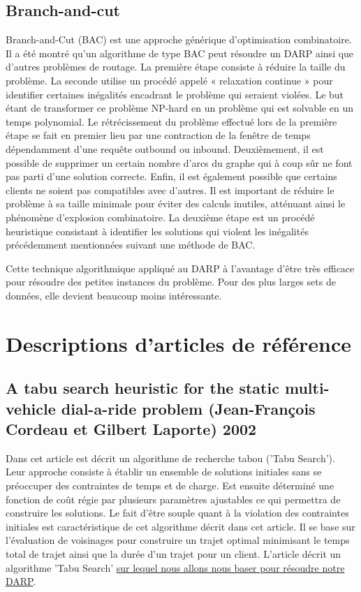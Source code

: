 \documentclass[10pt,a4paper]{report}
\begin{document}
\subsection*{Branch-and-cut}
Branch-and-Cut (BAC) est une approche générique d'optimisation combinatoire. Il a été montré qu'un algorithme de type BAC peut résoudre un DARP ainsi que d'autres problèmes de routage. 
La première étape consiste à réduire la taille du problème. La seconde utilise un procédé appelé « relaxation continue » pour identifier certaines inégalités encadrant le problème qui seraient violées. Le but étant de transformer ce problème NP-hard en un problème qui est solvable en un temps polynomial. 
Le rétrécissement du problème effectué lors de la première étape se fait en premier lieu par une contraction de la fenêtre de temps dépendamment d'une requête outbound ou inbound. Deuxièmement, il est possible de supprimer un certain nombre d'arcs du graphe qui à coup sûr ne font pas parti d'une solution correcte. Enfin, il est également possible que certains clients ne soient pas compatibles avec d'autres. Il est important de réduire le problème à sa taille minimale pour éviter des calculs inutiles, atténuant ainsi le phénomène d'explosion combinatoire. 
La deuxième étape est un procédé heuristique consistant à identifier les solutions qui violent les inégalités précédemment mentionnées suivant une méthode de BAC. 

Cette technique algorithmique appliqué au DARP à l'avantage d'être très efficace pour résoudre des petites instances du problème. Pour des plus larges sets de données, elle devient beaucoup moins intéressante. 

\section*{Descriptions d'articles de référence}
\subsection*{A tabu search heuristic for the static multi-vehicle dial-a-ride problem (Jean-François Cordeau et Gilbert Laporte) 2002}
Dans cet article est décrit un algorithme de recherche tabou ('Tabu Search'). Leur approche consiste à établir un ensemble de solutions initiales sans se préoccuper des contraintes de temps et de charge. Est ensuite déterminé une fonction de coût régie par plusieurs paramètres ajustables ce qui permettra de construire les solutions. Le fait d'être souple quant à la violation des contraintes initiales est caractéristique de cet algorithme décrit dans cet article. Il se base sur l'évaluation de voisinages pour construire un trajet optimal minimisant le temps total de trajet ainsi que la durée d'un trajet pour un client. L'article décrit un algorithme 'Tabu Search' \underline{sur lequel nous allons nous baser pour résoudre notre DARP}.
\end{document}
